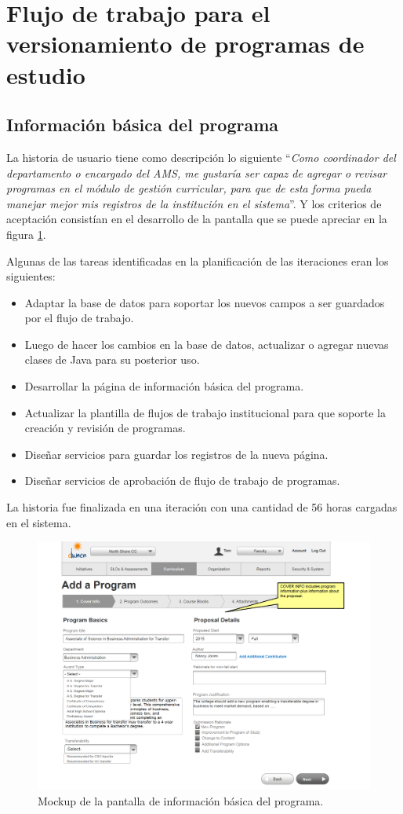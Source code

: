 \section{Flujo de trabajo para el versionamiento de programas de estudio}
\subsection{Información básica del programa}
La historia de usuario tiene como descripción lo siguiente \enquote{\textit{Como coordinador del departamento o encargado del AMS, me gustaría ser capaz de agregar o revisar programas en el módulo de gestión curricular, para que de esta forma pueda manejar mejor mis registros de la institución en el sistema}}. Y los criterios de aceptación consistían en el desarrollo de la pantalla que se puede apreciar en la figura \ref{program_cover_info}.

Algunas de las tareas identificadas en la planificación de las iteraciones eran los siguientes:
\begin{itemize}
	\item Adaptar la base de datos para soportar los nuevos campos a ser guardados por el flujo de trabajo.
	\item Luego de hacer los cambios en la base de datos, actualizar o agregar nuevas clases de Java para su posterior uso.
	\item Desarrollar la página de información básica del programa.
	\item Actualizar la plantilla de flujos de trabajo institucional para que soporte la creación y revisión de programas.
	\item Diseñar servicios para guardar los registros de la nueva página.
	\item Diseñar servicios de aprobación de flujo de trabajo de programas.
\end{itemize}

La historia fue finalizada en una iteración con una cantidad de 56 horas cargadas en el sistema.

\begin{figure}[H]
\centering
\includegraphics[width=125mm,scale=1]{Capitulos/DesarrollodelaAplicacion/Imagenes/program_cover_info}
\caption{Mockup de la pantalla de información básica del programa.}
  \label{program_cover_info}
\end{figure}

